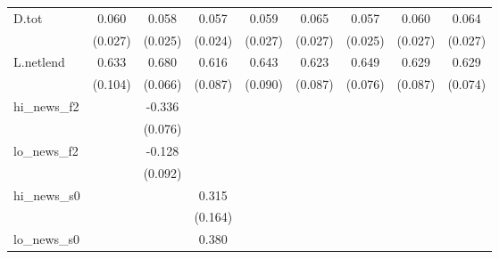 {\begin{tabular}{l*{8}{c}}
D.tot       &       0.060\sym{**} &       0.058\sym{**} &       0.057\sym{**} &       0.059\sym{**} &       0.065\sym{**} &       0.057\sym{**} &       0.060\sym{**} &       0.064\sym{**} \\
            &     (0.027)         &     (0.025)         &     (0.024)         &     (0.027)         &     (0.027)         &     (0.025)         &     (0.027)         &     (0.027)         \\
\addlinespace
L.netlend   &       0.633\sym{***}&       0.680\sym{***}&       0.616\sym{***}&       0.643\sym{***}&       0.623\sym{***}&       0.649\sym{***}&       0.629\sym{***}&       0.629\sym{***}\\
            &     (0.104)         &     (0.066)         &     (0.087)         &     (0.090)         &     (0.087)         &     (0.076)         &     (0.087)         &     (0.074)         \\
\addlinespace
hi\_news\_f2  &                     &      -0.336\sym{***}&                     &                     &                     &                     &                     &                     \\
            &                     &     (0.076)         &                     &                     &                     &                     &                     &                     \\
\addlinespace
lo\_news\_f2  &                     &      -0.128         &                     &                     &                     &                     &                     &                     \\
            &                     &     (0.092)         &                     &                     &                     &                     &                     &                     \\
\addlinespace
hi\_news\_s0  &                     &                     &       0.315\sym{*}  &                     &                     &                     &                     &                     \\
            &                     &                     &     (0.164)         &                     &                     &                     &                     &                     \\
\addlinespace
lo\_news\_s0  &                     &                     &       0.380\sym{***}&                     &                     &                     &                     &                     \\

\end{tabular}}
